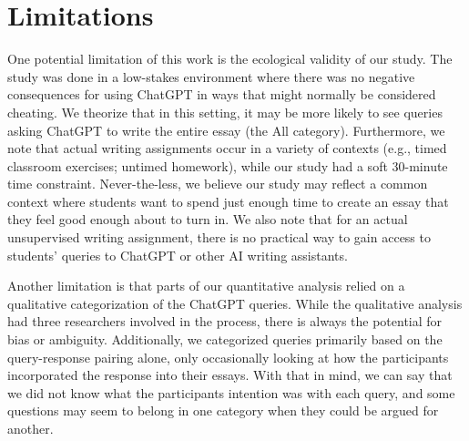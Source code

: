 \documentclass[manuscript,screen,acmsmall]{acmart}
\begin{document}
\section{Limitations}

    One potential limitation of this work is the ecological validity of our study.
    The study was done in a low-stakes environment where there was no negative consequences for using ChatGPT in ways that might normally be considered cheating.
    We theorize that in this setting, it may be more likely to see queries asking ChatGPT to write the entire essay (the All category).
    Furthermore, we note that actual writing assignments occur in a variety of contexts (e.g., timed classroom exercises; untimed homework), while our study had a soft 30-minute time constraint.
    Never-the-less, we believe our study may reflect a common context where students want to spend just enough time to create an essay that they feel good enough about to turn in.
    We also note that for an actual unsupervised writing assignment, there is no practical way to gain access to students' queries to ChatGPT or other AI writing assistants.
    

    Another limitation is that parts of our quantitative analysis relied on a qualitative categorization of the ChatGPT queries.
    While the qualitative analysis had three researchers involved in the process, there is always the potential for bias or ambiguity. 
    Additionally, we categorized queries primarily based on the query-response pairing alone, only occasionally looking at how the participants incorporated the response into their essays. 
    With that in mind, we can say that we did not know what the participants intention was with each query, and some questions may seem to belong in one category when they could be argued for another.
    
\end{document}
